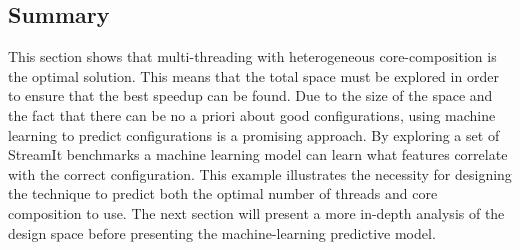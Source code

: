 \subsection{Summary}
This section shows that multi-threading with heterogeneous core-composition is the optimal solution.
This means that the total space must be explored in order to ensure that the best speedup can be found.
Due to the size of the space and the fact that there can be no a priori about good configurations, using machine learning to predict configurations is a promising approach. %
By exploring a set of StreamIt benchmarks a machine learning model can learn what features correlate with the correct configuration.
This example illustrates the necessity for designing the technique to predict both the optimal number of threads and core composition to use.
The next section will present a more in-depth analysis of the design space before presenting the machine-learning predictive model.
